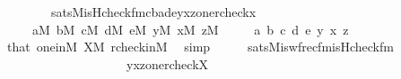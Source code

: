 \begin{isabellebody}
\ \ \ \ \ \ \ \ sats{\isacharparenleft}{\kern0pt}M{\isacharcomma}{\kern0pt}is{\isacharunderscore}{\kern0pt}Hcheck{\isacharunderscore}{\kern0pt}fm{\isacharparenleft}{\kern0pt}{}{\isacharcomma}{\kern0pt}{}{\isacharcomma}{\kern0pt}{}{\isacharcomma}{\kern0pt}{}{\isacharparenright}{\kern0pt}{\isacharcomma}{\kern0pt}{\isacharbrackleft}{\kern0pt}c{\isacharcomma}{\kern0pt}b{\isacharcomma}{\kern0pt}a{\isacharcomma}{\kern0pt}d{\isacharcomma}{\kern0pt}e{\isacharcomma}{\kern0pt}y{\isacharcomma}{\kern0pt}x{\isacharcomma}{\kern0pt}z{\isacharcomma}{\kern0pt}one{\isacharcomma}{\kern0pt}rcheck{\isacharparenleft}{\kern0pt}x{\isacharparenright}{\kern0pt}{\isacharbrackright}{\kern0pt}{\isacharparenright}{\kern0pt}{\isachardoublequoteclose}\isanewline
\ \ \ \ \ {\isachardoublequoteopen}a{\isasymin}M{\isachardoublequoteclose}\ {\isachardoublequoteopen}b{\isasymin}M{\isachardoublequoteclose}\ {\isachardoublequoteopen}c{\isasymin}M{\isachardoublequoteclose}\ {\isachardoublequoteopen}d{\isasymin}M{\isachardoublequoteclose}\ {\isachardoublequoteopen}e{\isasymin}M{\isachardoublequoteclose}\ {\isachardoublequoteopen}y{\isasymin}M{\isachardoublequoteclose}\ {\isachardoublequoteopen}x{\isasymin}M{\isachardoublequoteclose}\ {\isachardoublequoteopen}z{\isasymin}M{\isachardoublequoteclose}\isanewline
\ \ \ \ \ a\ b\ c\ d\ e\ y\ x\ z\isanewline
\ \ \ \ \isamarkupfalse%
\ that\ one{\isacharunderscore}{\kern0pt}in{\isacharunderscore}{\kern0pt}M\ {\isacartoucheopen}X{\isasymin}M{\isacartoucheclose}\ rcheck{\isacharunderscore}{\kern0pt}in{\isacharunderscore}{\kern0pt}M\ \isamarkupfalse%
\ simp\isanewline
\ \ \isamarkupfalse%
\ \isamarkupfalse%
\ {}{\isacharcolon}{\kern0pt}{\isachardoublequoteopen}sats{\isacharparenleft}{\kern0pt}M{\isacharcomma}{\kern0pt}is{\isacharunderscore}{\kern0pt}wfrec{\isacharunderscore}{\kern0pt}fm{\isacharparenleft}{\kern0pt}is{\isacharunderscore}{\kern0pt}Hcheck{\isacharunderscore}{\kern0pt}fm{\isacharparenleft}{\kern0pt}{}{\isacharcomma}{\kern0pt}{}{\isacharcomma}{\kern0pt}{}{\isacharcomma}{\kern0pt}{}{\isacharparenright}{\kern0pt}{\isacharcomma}{\kern0pt}{}{\isacharcomma}{\kern0pt}{}{\isacharcomma}{\kern0pt}{}{\isacharparenright}{\kern0pt}{\isacharcomma}{\kern0pt}\isanewline
\ \ \ \ \ \ \ \ \ \ \ \ \ \ \ \ \ \ \ \ {\isacharbrackleft}{\kern0pt}y{\isacharcomma}{\kern0pt}x{\isacharcomma}{\kern0pt}z{\isacharcomma}{\kern0pt}one{\isacharcomma}{\kern0pt}rcheck{\isacharparenleft}{\kern0pt}X{\isacharparenright}{\kern0pt}{\isacharbrackright}{\kern0pt}{\isacharparenright}{\kern0pt}\ {\isasymlongleftrightarrow}\isanewline

\end{isabellebody}
